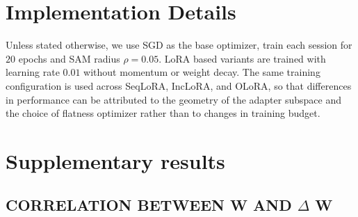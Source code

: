 \documentclass{article}
\theoremstyle{plain}
\theoremstyle{definition}
\theoremstyle{remark}
\begin{document}
\section{Implementation Details}


Unless stated otherwise, we use SGD as the base optimizer, train each session for $20$ epochs and SAM radius $\rho = 0.05$. LoRA based variants are trained with learning rate $0.01$ without momentum or weight decay. The same training configuration is used across SeqLoRA, IncLoRA, and OLoRA, so that differences in performance can be attributed to the geometry of the adapter subspace and the choice of flatness optimizer rather than to changes in training budget.



    
\section{Supplementary results}

\subsection{CORRELATION BETWEEN W AND $\Delta$ W}



\begin{table}[thpb]
\centering
\caption{Performance under different scope.}
\label{tab:lora——or_full}
\setlength{\tabcolsep}{3pt}
\renewcommand{\arraystretch}{1}
\end{table}
\end{document}

